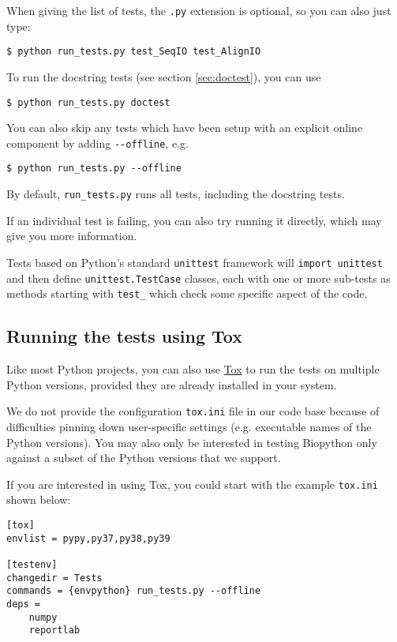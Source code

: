 When giving the list of tests, the \verb|.py| extension is optional,
so you can also just type:

\begin{verbatim}
$ python run_tests.py test_SeqIO test_AlignIO
\end{verbatim}

To run the docstring tests (see section \ref{sec:doctest}), you can use

\begin{verbatim}
$ python run_tests.py doctest
\end{verbatim}

You can also skip any tests which have been setup with an explicit
online component by adding \verb|--offline|, e.g.

\begin{verbatim}
$ python run_tests.py --offline
\end{verbatim}

By default, \verb|run_tests.py| runs all tests, including the docstring tests.

If an individual test is failing, you can also try running it
directly, which may give you more information.

Tests based on Python's standard  \verb|unittest| framework will
\verb|import unittest| and then define \verb|unittest.TestCase| classes,
each with one or more sub-tests as methods starting with \verb|test_| which
check some specific aspect of the code.

\subsection{Running the tests using Tox}

Like most Python projects, you can also use
\href{https://tox.readthedocs.org/en/latest/}{Tox} to run the tests on multiple
Python versions, provided they are already installed in your system.

We do not provide the configuration \texttt{tox.ini} file in our code base because
of difficulties pinning down user-specific settings (e.g. executable names of the
Python versions). You may also only be interested in testing Biopython only against
a subset of the Python versions that we support.

If you are interested in using Tox, you could start with the example
\texttt{tox.ini} shown below:

\begin{verbatim}
[tox]
envlist = pypy,py37,py38,py39

[testenv]
changedir = Tests
commands = {envpython} run_tests.py --offline
deps =
    numpy
    reportlab
\end{verbatim}

